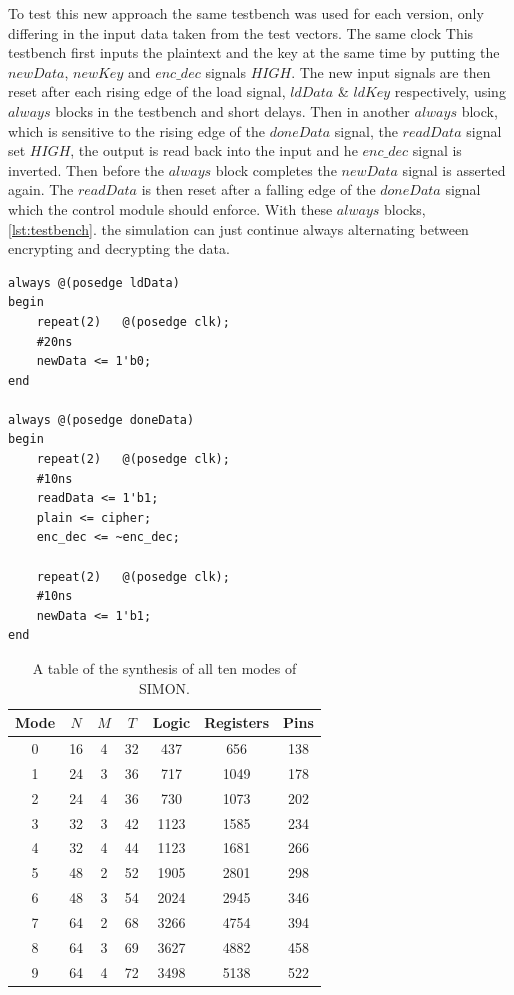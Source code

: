 \documentclass[12pt,twoside,a4paper]{report}
\begin{document}
	
	To test this new approach the same testbench was used for each version, only differing in the input data taken from the test vectors. The same clock This testbench first inputs the plaintext and the key at the same time by putting the $newData$, $newKey$ and $enc\_dec$ signals $HIGH$. The new input signals are then reset after each rising edge of the load signal, $ldData$ \& $ldKey$ respectively, using $always$ blocks in the testbench and short delays. Then in another $always$ block, which is sensitive to the rising edge of the $doneData$ signal, the $readData$ signal set $HIGH$, the output is read back into the input and he $enc\_dec$ signal is inverted. Then before the $always$ block completes the $newData$ signal is asserted again. The $readData$ is then reset after a falling edge of the $doneData$ signal which the control module should enforce. With these $always$ blocks, \autoref{lst:testbench}. the simulation can just continue always alternating between encrypting and decrypting the data.

	\begin{minipage}{\linewidth}
	\begin{lstlisting}[label={lst:testbench},caption={The $always$ blocks of the testnches},style=CStyle]
always @(posedge ldData)
begin
	repeat(2)	@(posedge clk);
	#20ns
	newData <= 1'b0;
end

always @(posedge doneData)
begin
	repeat(2)	@(posedge clk);
	#10ns
	readData <= 1'b1;
	plain <= cipher;
	enc_dec <= ~enc_dec;
	
	repeat(2)	@(posedge clk);
	#10ns
	newData <= 1'b1;
end
	\end{lstlisting}
	\end{minipage}

	\begin{table}[H]
	\centering
	\begin{tabular}{||c|c|c|c|c|c|c||}
		\hline \hline
		Mode  & $N$ & $M$ & $T$ & Logic & Registers & Pins\\
		\hline \hline
		0 & 16 & 4 & 32 & 437 &	656 &	138 \\
		\hline
		1 & 24 & 3 & 36 & 717	& 1049 & 178  \\
		2 & 24 & 4 & 36 & 730 &	1073 & 202  \\
		\hline
		3 & 32 & 3 & 42 & 1123 & 1585 &	234  \\
		4 & 32 & 4 & 44 & 1123 & 1681 &	266	\\
		\hline
		5 & 48 & 2 & 52 & 1905 & 2801 &	298  \\
		6 & 48 & 3 & 54 & 2024 & 2945 & 346 \\
		\hline
		7 & 64 & 2 & 68 & 3266 & 4754 & 394  \\
		8 & 64 & 3 & 69 & 3627 & 4882 & 458 \\
 		9 & 64 & 4 & 72 & 3498 & 5138 &	522 \\
		\hline \hline
	\end{tabular}
	\caption{A table of the synthesis of all ten modes of SIMON.}
	\label{table:synth2}
	\end{table}  
	
\end{document}
